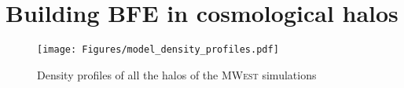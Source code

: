 \documentclass[twocolumn, linenumbers]{openjournal}
\newcommand{\mwest}{\textsc{MWest }}
\begin{document}


{}


\appendix


\section{Building BFE in cosmological halos}\label{sec:appendix}

\begin{figure}
    \centering
    \texttt{[image: Figures/model\_density\_profiles.pdf]}
    \caption{Density profiles of all the halos of the \mwest simulations}\label{fig:nfw_basis}
\end{figure}





\end{document}
